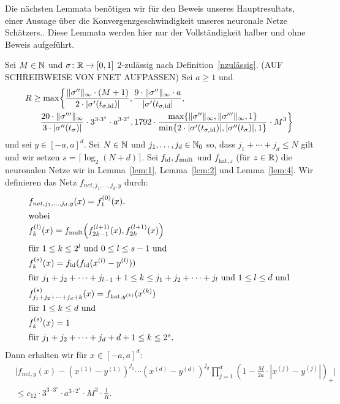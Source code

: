Die nächsten Lemmata benötigen wir für den Beweis unseres Hauptresultats, einer Aussage über die Konvergenzgeschwindigkeit unseres neuronale Netze Schätzers.. Diese Lemmata werden hier nur der Vollständigkeit halber und ohne Beweis aufgeführt.
\begin{lem}
\label{lem:5}
Sei $M \in \mathbb{N}$ und $\sigma\colon \mathbb{R} \to [0, 1]$ $2$-zulässig nach Definition~\ref{nzulässig}. (AUF SCHREIBWEISE VON FNET AUFPASSEN)
Sei $a \geq 1$ und 
\begin{equation*}
\begin{split}
R & \geq \max\biggl\{\frac{\|\sigma''\|_{\infty} \cdot (M + 1)}{2 \cdot |\sigma'(t_{\sigma, \mathrm{id}})|}, \frac{9 \cdot \|\sigma''\|_{\infty} \cdot a}{|\sigma'(t_{\sigma, \mathrm{id}}|}, \\
& \quad \frac{20 \cdot \|\sigma'''\|_{\infty}}{3 \cdot |\sigma''(t_{\sigma})|} \cdot 3^{3 \cdot 3^s} \cdot a^{3 \cdot 2^s}, 1792 \cdot \frac{\max\{\|\sigma''\|_{\infty},\|\sigma'''\|_{\infty}, 1\}}{\min\{2 \cdot |\sigma'(t_{\sigma, \mathrm{id}})|, |\sigma''(t_{\sigma})|, 1\}} \cdot M^3 \biggr\}
\end{split}
\end{equation*}
und sei $y \in [-a, a]^d.$ Sei $N \in \mathbb{N}$ und $j_1,\dots,j_d \in \mathbb{N}_0$ so, dass $j_1 + \cdots + j_d \leq N$ gilt und wir setzen $s = \lceil\log_2(N + d)\rceil$. Sei $f_{\mathrm{id}}, f_{\mathrm{mult}}$ und $f_{\mathrm{hat}, z}$ (für $z \in \mathbb{R}$) die neuronalen Netze wir in Lemma~\ref{lem:1}, Lemma~\ref{lem:2} und Lemma~\ref{lem:4}. Wir definieren das Netz $f_{net,j_1,\dots,j_d,y}$ durch:
\begin{align*}
\label{fnet}
& f_{net,j_1,\dots,j_d,y}(x) = f_1^{(0)}(x). \\
\intertext{wobei} 
& f_k^{(l)}(x) = f_{\mathrm{mult}}\Big(f_{2k - 1}^{(l + 1)}(x),f_{2k}^{(l + 1)}(x)\Big) \\
\intertext{für $1 \leq k \leq 2^l$ und $0 \leq l \leq s - 1$ und} 
& f_k^{(s)}(x) = f_{\mathrm{id}}(f_{\mathrm{id}}(x^{(l)} - y^{(l)}))  \\
\intertext{für $j_1 + j_2 + \dots + j_{l-1} + 1 \leq k \leq j_1 + j_2 + \dots + j_l$ und $1 \leq l \leq d$ und} 
& f_{j_1 + j_2 + \dots + j_d + k}^{(s)}(x) = f_{\mathrm{hat},y^{(k)}}(x^{(k)}) \\
\intertext{für $1 \leq k \leq d$ und} 
& f_k^{(s)}(x) = 1 \\
\intertext{für $j_1 + j_2 + \dots + j_d + d + 1 \leq k \leq 2^s.$}
\end{align*} 
Dann erhalten wir für $x \in [-a, a]^d$:
\begin{equation*}
\begin{split}
& \bigg|f_{net, y}(x) - (x^{(1)} - y^{(1)})^{j_1} \cdots (x^{(d)} - y^{(d)})^{j_d} \prod_{j = 1}^d (1 - \frac{M}{2a} \cdot |x^{(j)} - y^{(j)}|)_+\bigg| \\
& \leq c_{12} \cdot 3^{3 \cdot 3^s} \cdot a^{3 \cdot 2^s} \cdot M^3 \cdot \frac{1}{R}.
\end{split}
\end{equation*}
\end{lem}
